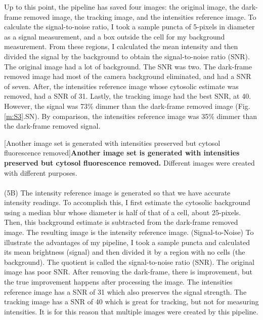 Up to this point, the pipeline has saved four images: the original image, the dark-frame removed image, the tracking image, and the intensities reference image. To calculate the signal-to-noise ratio, I took a sample puncta of 5-pixels in diameter as a signal measurement, and a box outside the cell for my background measurement. From these regions, I calculated the mean intensity and then divided the signal by the background to obtain the signal-to-noise ratio (SNR). The original image had a lot of background. The SNR was two. The dark-frame removed image had most of the camera background eliminated, and had a SNR of seven. After, the intensities reference image whose cytosolic estimate was removed, had a SNR of 31. Lastly, the tracking image had the best SNR, at 40. However, the signal was 73\% dimmer than the dark-frame removed image (Fig. \ref{m:S3}.SN). By comparison, the intensities reference image was 35\% dimmer than the dark-frame removed signal.


\begin{centering}
[Another image set is generated with intensities preserved but cytosol fluorescence removed]{\textbf{Another image set is generated with intensities preserved but cytosol fluorescence removed.} Different images were created with different purposes.
\\
\\
(5B) The intensity reference image is generated so that we have accurate intensity readings. To accomplish this, I first estimate the cytosolic background using a median blur whose diameter is half of that of a cell, about 25-pixels. Then, this background estimate is subtracted from the dark-frame removed image. The resulting image is the intensity reference image. (Signal-to-Noise) To illustrate the advantages of my pipeline, I took a sample puncta and calculated its mean brightness (signal) and then divided it by a region with no cells (the background). The quotient is called the signal-to-noise ratio (SNR). The original image has poor SNR. After removing the dark-frame, there is improvement, but the true improvement happens after processing the image. The intensities reference image has a SNR of 31 which also preserves the signal strength. The tracking image has a SNR of 40 which is great for tracking, but not for measuring intensities. It is for this reason that multiple images were created by this pipeline.}
\label{m:S3}
\end{centering}


